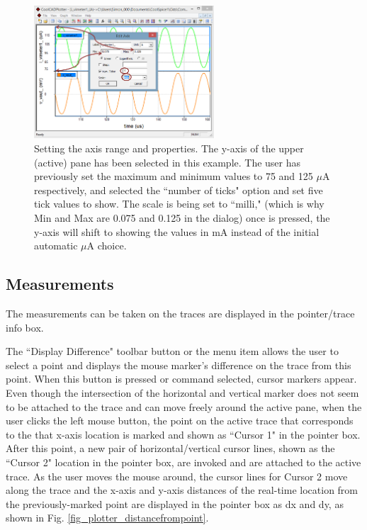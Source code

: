 \begin{figure}
    \includegraphics[width=0.6\textwidth]{./figures/plotter_netlist_editor_figures/Plotter_AxisProperties.png}
    \caption{{Setting the axis range and properties. The y-axis of the upper (active) pane has been selected in this example. The user has previously set the maximum and minimum values to 75 and 125 $\mu$A respectively, and selected the ``number of ticks" option and set five tick values to show. The scale is being set to ``milli," (which is why Min and Max are 0.075 and 0.125 in the dialog) once  is pressed, the y-axis will shift to showing the values in mA instead of the initial automatic $\mu$A choice.}}
  \label{fig_plotter_axisproperties}
\end{figure}


\subsection{Measurements}
\label{subsec_pane_measurements}

The measurements can be taken on the traces are displayed in the pointer/trace info box.  

The ``\textsf{Display Difference}" toolbar button or the  menu item allows the user to select a point and displays the mouse marker's difference on the trace from this point.  When this button is pressed or command selected, cursor markers appear.  Even though the intersection of the horizontal and vertical marker does not seem to be attached to the trace and can move freely around the active pane, when the user clicks the left mouse button, the point on the active trace that corresponds to the that x-axis location is marked and shown as ``\textsf{Cursor 1}" in the pointer box. After this point, a new pair of horizontal/vertical cursor lines, shown as the ``\textsf{Cursor 2}" location in the pointer box, are invoked and are attached to the active trace.  As the user moves the mouse around, the cursor lines for Cursor 2 move along the trace and the x-axis and y-axis distances of the real-time location from the previously-marked point are displayed in the pointer box as \textsf{dx} and \textsf{dy}, as shown in Fig. \ref{fig_plotter_distancefrompoint}.  

